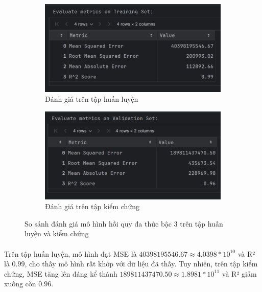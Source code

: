 \begin{figure}[H]
    \centering
    \begin{subfigure}[b]{0.48\textwidth}
        \centering
        \includegraphics[width=\linewidth]{img/Evaluate_Poly_Training_Set.png}
        \caption{Đánh giá trên tập huấn luyện}
        \label{fig:poly-linear-train}
    \end{subfigure}
    \hfill
    \begin{subfigure}[b]{0.48\textwidth}
        \centering
        \includegraphics[width=\linewidth]{img/Evaluate_Poly_Validation_Set.png}
        \caption{Đánh giá trên tập kiểm chứng}
        \label{fig:poly-linear-valid}
    \end{subfigure}
    \caption{So sánh đánh giá mô hình hồi quy đa thức bậc 3 trên tập huấn luyện và kiểm chứng} 
    \label{fig:poly-linear-eval}
\end{figure}

\paragraph{}{Trên tập huấn luyện, mô hình đạt MSE là $40398195546.67 \approx 4.0398 * 10^{10}$ và R² là $0.99$, cho thấy mô hình rất khớp với dữ liệu đã thấy. Tuy nhiên, trên tập kiểm chứng, MSE tăng lên đáng kể thành $189811437470.50 \approx 1.8981 * 10^{11}$ và R² giảm xuống còn $0.96$.}

